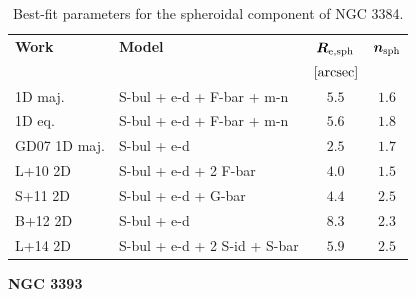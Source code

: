 \documentclass[preprint2]{emulateapj}
\begin{document}
  \begin{table}[h]
  \small
  \caption{Best-fit parameters for the spheroidal component of NGC 3384.}
  \begin{center}
  \begin{tabular}{llcc}
  \hline
  {\bf Work} & {\bf Model}   & $\bm R_{\rm e,sph}$    & $\bm n_{\rm sph}$ \\
    &  &  $[\rm arcsec]$ & \\
  \hline
  1D maj. & S-bul + e-d + F-bar + m-n & $5.5$  &  $1.6$ \\
  1D eq.  & S-bul + e-d + F-bar + m-n & $5.6$  &  $1.8$ \\
  \hline
  GD07 1D maj.         & S-bul + e-d		      & $2.5$  &  $1.7$ \\
  L+10 2D         & S-bul + e-d + 2 F-bar        & $4.0$  &  $1.5$ \\
  S+11 2D         & S-bul + e-d + G-bar	      & $4.4$  &  $2.5$ \\
  B+12 2D         & S-bul + e-d		      & $8.3$  &  $2.3$ \\
  L+14 2D         & S-bul + e-d + 2 S-id + S-bar & $5.9$  &  $2.5$ \\
  \hline
  \end{tabular}
  \end{center}
  \label{tab:n3384}
  \end{table}

  \clearpage\newpage\noindent
  {\bf NGC 3393 \\}
\end{document}
